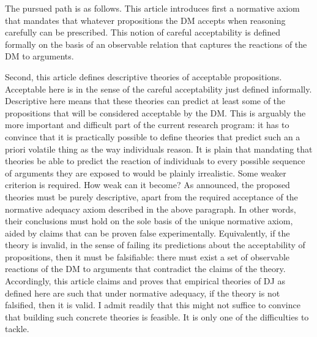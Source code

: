 \documentclass[version=last, pagesize, twoside=off, bibliography=totoc, DIV=calc, fontsize=12pt, a4paper, french, english]{scrartcl}
\begin{document}
The pursued path is as follows.
This article introduces first a normative axiom that mandates that whatever propositions the \ac{DM} accepts when reasoning carefully can be prescribed. This notion of careful acceptability is defined formally on the basis of an observable relation that captures the reactions of the \ac{DM} to arguments.

Second, this article defines descriptive theories of acceptable propositions. Acceptable here is in the sense of the careful acceptability just defined informally. Descriptive here means that these theories can predict at least some of the propositions that will be considered acceptable by the \ac{DM}.
This is arguably the more important and difficult part of the current research program: it has to convince that it is practically possible to define theories that predict such an a priori volatile thing as the way individuals reason. It is plain that mandating that theories be able to predict the reaction of individuals to every possible sequence of arguments they are exposed to would be plainly irrealistic. Some weaker criterion is required. How weak can it become? As announced, the proposed theories must be purely descriptive, apart from the required acceptance of the normative adequacy axiom described in the above paragraph. In other words, their conclusions must hold on the sole basis of the unique normative axiom, aided by claims that can be proven false experimentally. Equivalently, if the theory is invalid, in the sense of failing its predictions about the acceptability of propositions, then it must be falsifiable: there must exist a set of observable reactions of the \ac{DM} to arguments that contradict the claims of the theory. Accordingly, this article claims and proves that empirical theories of \ac{DJ} as defined here are such that under normative adequacy, if the theory is not falsified, then it is valid. I admit readily that this might not suffice to convince that building such concrete theories is feasible. It is only one of the difficulties to tackle.
\end{document}
